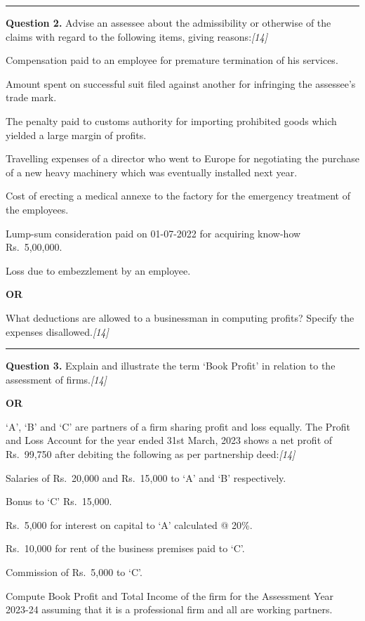 \documentclass[11pt,a4paper]{article}
\newcommand{\pts}[1]{\hfill   \textit{[#1]}}
\begin{document}
\medskip\rule{\linewidth}{0.2pt}




\noindent   \textbf{Question 2.}
Advise an assessee about the admissibility or otherwise of the claims with regard to the following items, giving reasons:\pts{14}

\begin{parts}
  \item Compensation paid to an employee for premature termination of his services.
  \item Amount spent on successful suit filed against another for infringing the assessee's trade mark.
  \item The penalty paid to customs authority for importing prohibited goods which yielded a large margin of profits.
  \item Travelling expenses of a director who went to Europe for negotiating the purchase of a new heavy machinery which was eventually installed next year.
  \item Cost of erecting a medical annexe to the factory for the emergency treatment of the employees.
  \item Lump-sum consideration paid on 01-07-2022 for acquiring know-how Rs.\ 5,00,000.
  \item Loss due to embezzlement by an employee.
\end{parts}

\centerline{   \textbf{OR}}

What deductions are allowed to a businessman in computing profits? Specify the expenses disallowed.\pts{14}

\medskip\rule{\linewidth}{0.2pt}




\noindent   \textbf{Question 3.}
Explain and illustrate the term `Book Profit' in relation to the assessment of firms.\pts{14}

\centerline{   \textbf{OR}}

`A', `B' and `C' are partners of a firm sharing profit and loss equally. The Profit and Loss Account for the year ended 31st March, 2023 shows a net profit of Rs.\ 99,750 after debiting the following as per partnership deed:\pts{14}

\begin{parts}
  \item Salaries of Rs.\ 20,000 and Rs.\ 15,000 to `A' and `B' respectively.
  \item Bonus to `C' Rs.\ 15,000.
  \item Rs.\ 5,000 for interest on capital to `A' calculated @ 20\%.
  \item Rs.\ 10,000 for rent of the business premises paid to `C'.
  \item Commission of Rs.\ 5,000 to `C'.
\end{parts}
Compute Book Profit and Total Income of the firm for the Assessment Year 2023-24 assuming that it is a professional firm and all are working partners.
\end{document}
